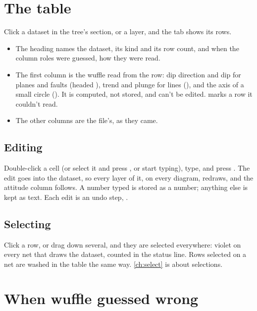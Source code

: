 \section{The table}\label{sec:table}


Click a dataset in the tree's  section, or a layer, and the  tab
shows its rows.

\begin{itemize}
\item The heading names the dataset, its kind and its row count, and when the column roles were guessed,
how they were read.
\item The first column is the  wuffle read from the row: dip direction and dip for planes
and faults (headed ), trend and plunge for lines (), and the axis of a
small circle (). It is computed, not stored, and can't be edited.  marks a row it
couldn't read.
\item The other columns are the file's, as they came.
\end{itemize}

\subsection{Editing}

Double-click a cell (or select it and press , or start typing), type, and press .
The edit goes into the dataset, so every layer of it, on every diagram, redraws, and the attitude column
follows. A number typed is stored as a number; anything
else is kept as text. Each edit is an undo step, .

\subsection{Selecting}

Click a row, or drag down several, and they are selected everywhere: violet on every net that draws the
dataset, counted in the status line. Rows selected on a net are washed in the table the same way.
\cref{ch:select} is about selections.

\section{When wuffle guessed wrong}\label{sec:columns}

